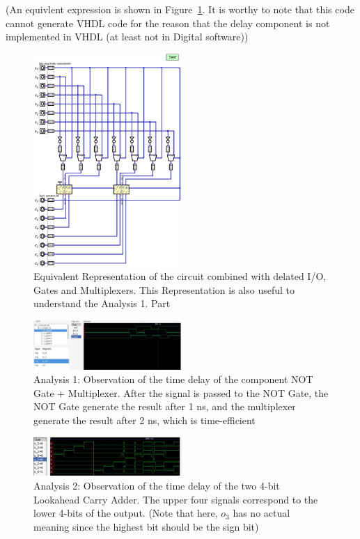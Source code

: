 \documentclass[conference]{IEEEtran}
\begin{document}
(An equivlent expression is shown in Figure~\ref{fig:delay}. It is worthy to note that this code cannot generate VHDL code for the reason that the delay component is not implemented in VHDL (at least not in Digital software))


\begin{figure}[h!]
    \centering
    \includegraphics[width=0.5\textwidth]{assets/twos_complement_dq_copy_delay.png}
    \caption{Equivalent Representation of the circuit combined with delated I/O, Gates and Multiplexers. This Representation is also useful to understand the Analysis 1. Part}
    \label{fig:delay}
\end{figure}


\begin{figure}[h!]
    \centering
    \includegraphics[width=0.5\textwidth]{assets/gtkwave-1.png}
    \caption{Analysis 1: Observation of the time delay of the component {NOT Gate + Multiplexer}. After the signal is passed to the NOT Gate, the NOT Gate generate the result after 1 ns, and the multiplexer generate the result after 2 ns, which is time-efficient}
    \label{fig:analysis1}
\end{figure}

\begin{figure}[h!]
    \centering
    \includegraphics[width=0.5\textwidth]{assets/gtkwave-2.png}
    \caption{Analysis 2: Observation of the time delay of the two 4-bit Lookahead Carry Adder. The upper four signals correspond to the lower 4-bits of the output. (Note that here, $o_3$ has no actual meaning since the highest bit should be the sign bit)}
    \label{fig:analysis2}
\end{figure}
\end{document}
